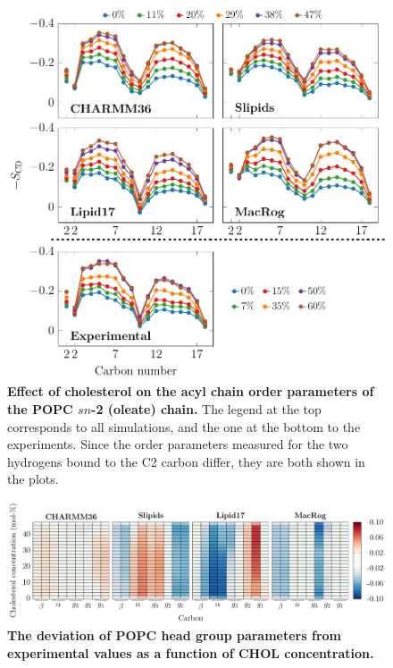 \documentclass[journal=jpcbfk]{achemso}
\begin{document}
\begin{figure}[htb!]
    \centering
    \includegraphics[width=\linewidth]{../FIGS/oleate.pdf}
    \caption{\label{SIfig:oleate}%
     \textbf{Effect of cholesterol on the acyl chain order parameters of the POPC $sn$-2 (oleate) chain.}
     The legend at the top corresponds to all simulations, and the one at the bottom to the experiments. Since the order parameters measured for the two hydrogens bound to the C2 carbon differ, they are both shown in the plots.
    }
\end{figure}

\begin{figure}[htb!]
    \centering
    \includegraphics[width=\linewidth]{../FIGS/OP_headgroup.pdf}
    \caption{\label{SIfig:headgroups}%
     \textbf{The deviation of POPC head group parameters from experimental values as a function of CHOL concentration.}
    }
\end{figure}
\end{document}
